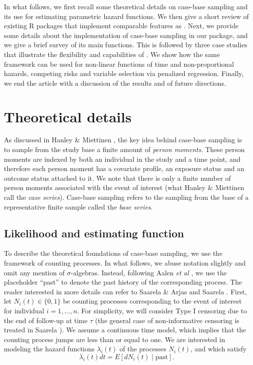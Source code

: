 In what follows, we first recall some theoretical details on case-base
sampling and its use for estimating parametric hazard functions. We then
give a short review of existing \textsf{R} packages that implement
comparable features as . Next, we provide some details
about the implementation of case-base sampling in our package, and we
give a brief survey of its main functions. This is followed by three
case studies that illustrate the flexibility and capabilities of
. We show how the same framework can be used for
non-linear functions of time and non-proportional hazards, competing
risks and variable selection via penalized regression. Finally, we end
the article with a discussion of the results and of future directions.

\hypertarget{theory}{%
\section{Theoretical details}\label{theory}}

As discussed in Hanley \& Miettinen \citeyearpar{hanley2009fitting}, the
key idea behind case-base sampling is to sample from the study base a
finite amount of \emph{person moments}. These person moments are indexed
by both an individual in the study and a time point, and therefore each
person moment has a covariate profile, an exposure status and an outcome
status attached to it. We note that there is only a finite number of
person moments associated with the event of interest (what Hanley \&
Miettinen call the \emph{case series}). Case-base sampling refers to the
sampling from the base of a representative finite sample called the
\emph{base series}.

\hypertarget{likelihood-and-estimating-function}{%
\subsection{Likelihood and estimating
function}\label{likelihood-and-estimating-function}}

To describe the theoretical foundations of case-base sampling, we use
the framework of counting processes. In what follows, we abuse notation
slightly and omit any mention of \(\sigma\)-algebras. Instead, following
Aalen \emph{et al} \citeyearpar{aalen2008survival}, we use the
placeholder ``past'' to denote the past history of the corresponding
process. The reader interested in more details can refer to Saarela \&
Arjas \citeyearpar{saarela2015non} and Saarela
\citeyearpar{saarela2016case}. First, let \(N_{i}(t) \in \{0, 1\}\) be
counting processes corresponding to the event of interest for individual
\(i=1, \ldots,n\). For simplicity, we will consider Type I censoring due
to the end of follow-up at time \(\tau\) (the general case of
non-informative censoring is treated in Saarela
\citeyearpar{saarela2016case}). We assume a continuous time model, which
implies that the counting process jumps are less than or equal to one.
We are interested in modeling the hazard functions \(\lambda_{i}(t)\) of
the processes \(N_i(t)\), and which satisfy
\[\lambda_{i}(t) dt = E[dN_{i}(t)\mid \mathrm{past}].\]

